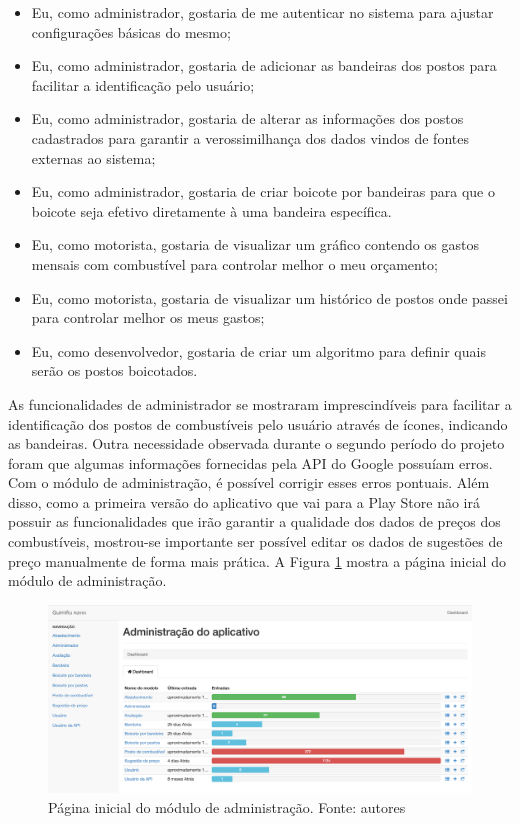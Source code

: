\begin{itemize}
    \item Eu, como administrador, gostaria de me autenticar no sistema para ajustar configurações básicas do mesmo;
    \item Eu, como administrador, gostaria de adicionar as bandeiras dos postos para facilitar a identificação pelo usuário;
    \item Eu, como administrador, gostaria de alterar as informações dos postos cadastrados para garantir a verossimilhança dos dados vindos de fontes externas ao sistema;
    \item Eu, como administrador, gostaria de criar boicote por bandeiras para que o boicote seja efetivo diretamente à uma bandeira específica.
    \item Eu, como motorista, gostaria de visualizar um gráfico contendo os gastos mensais com combustível para controlar melhor o meu orçamento;
    \item Eu, como motorista, gostaria de visualizar um histórico de postos onde passei para controlar melhor os meus gastos;
    \item Eu, como desenvolvedor, gostaria de criar um algoritmo para definir quais serão os postos boicotados.
\end{itemize}

As funcionalidades de administrador se mostraram imprescindíveis para facilitar a identificação dos postos de combustíveis pelo usuário através de ícones, indicando as bandeiras. Outra necessidade observada durante o segundo período do projeto foram que algumas informações fornecidas pela API do Google possuíam erros. Com o módulo de administração, é possível corrigir esses erros pontuais. Além disso, como a primeira versão do aplicativo que vai para a Play Store não irá possuir as funcionalidades que irão garantir a qualidade dos dados de preços dos combustíveis, mostrou-se importante ser possível editar os dados de sugestões de preço manualmente de forma mais prática. A Figura \ref{img:admin-1} mostra a página inicial do módulo de administração.

\begin{figure}[H]
    \centering
    \includegraphics[scale=0.32]{figuras/admin-1.png}
    \caption[Página inicial do módulo de administração]{Página inicial do módulo de administração. Fonte: autores}
    \label{img:admin-1}
\end{figure}

